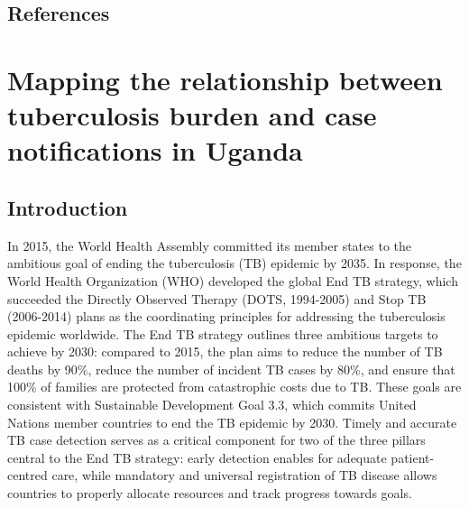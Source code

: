 \documentclass[
]{report}
\begin{document}
\hypertarget{references-1}{%
\section{References}\label{references-1}}

\printbibliography[segment=\therefsegment,heading=none]

\hypertarget{mapping-the-relationship-between-tuberculosis-burden-and-case-notifications-in-uganda}{%
\chapter{Mapping the relationship between tuberculosis burden and case notifications in Uganda}\label{mapping-the-relationship-between-tuberculosis-burden-and-case-notifications-in-uganda}}

\hypertarget{introduction-2}{%
\section{Introduction}\label{introduction-2}}

In 2015, the World Health Assembly committed its member states to the ambitious goal of ending the tuberculosis (TB) epidemic by 2035. In response, the World Health Organization (WHO) developed the global End TB strategy, which succeeded the Directly Observed Therapy (DOTS, 1994-2005) and Stop TB (2006-2014) plans as the coordinating principles for addressing the tuberculosis epidemic worldwide.\autocite{Onozaki2010} The End TB strategy outlines three ambitious targets to achieve by 2030: compared to 2015, the plan aims to reduce the number of TB deaths by 90\%, reduce the number of incident TB cases by 80\%, and ensure that 100\% of families are protected from catastrophic costs due to TB.\autocite{WorldHealthOrganization2015a} These goals are consistent with Sustainable Development Goal 3.3, which commits United Nations member countries to end the TB epidemic by 2030.\autocite{WorldHealthOrganization2020a} Timely and accurate TB case detection serves as a critical component for two of the three pillars central to the End TB strategy: early detection enables for adequate patient-centred care, while mandatory and universal registration of TB disease allows countries to properly allocate resources and track progress towards goals.\autocite{WorldHealthOrganization2015}
\end{document}
